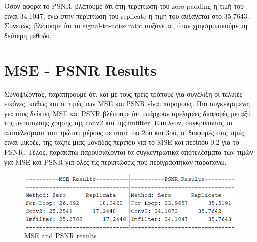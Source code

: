 \documentclass{article}
\begin{document}
	\noindent
	Όσον αφορά το PSNR, βλέπουμε ότι στη περίπτωση του zero padding η τιμή του είναι 34.1047, ένω στην περίπτωση του replicate η τιμή του αυξάνεται στο 35.7643. Συνεπώς, βλέπουμε ότι το signal-to-noise ratio αυξάνεται, όταν χρησιμοποιούμε τη δεύτερη μέθοδο.
\pagebreak
\section*{MSE - PSNR Results}
	Συνοψίζοντας, παρατηρούμε ότι και με τους τρεις τρόπους για συνέλιξη οι τελικές εικόνες, καθώς και οι τιμές των MSE και PSNR είναι παρόμοιες. Πιο συγκεκριμένα, για τους δείκτες MSE και PSNR βλέπουμε ότι υπάρχουν αμελητέες διαφορές μεταξύ της περίπτωσης χρήσης της conv2 και της imfilter. Επιπλέον, συγκρίνοντας τα αποτελέσματα του πρώτου μέρους με αυτά του 2ου και 3ου, οι διαφορές στις τιμές είναι μικρές, της τάξης μιας μονάδας περίπου για το MSE και περίπου 0.2 για το PSNR. Τέλος, παρακάτω παρουσιάζονται τα συγκεντρωτικά αποτελέσματα των τιμών για MSE και PSNR για όλες τις περιπτώσεις που περιγράφτηκαν παραπάνω.
	
	\begin{figure}[h!]
		\centering
		\includegraphics[width=0.8\linewidth]{./output_images/mse_psnr_results.png}
		\caption{MSE and PSNR results}
	\end{figure}
\end{document}
